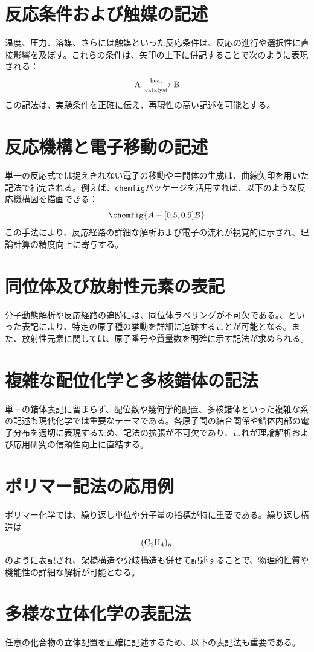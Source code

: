 \documentclass{ltjsarticle}
\begin{document}
\section{反応条件および触媒の記述}
温度、圧力、溶媒、さらには触媒といった反応条件は、反応の進行や選択性に直接影響を及ぼす。これらの条件は、矢印の上下に併記することで次のように表現される：
\[
\ce{A ->[heat][catalyst] B}
\]
この記法は、実験条件を正確に伝え、再現性の高い記述を可能とする。

\section{反応機構と電子移動の記述}
単一の反応式では捉えきれない電子の移動や中間体の生成は、曲線矢印を用いた記法で補完される。例えば、\texttt{chemfig}パッケージを活用すれば、以下のような反応機構図を描画できる：
\[
\chemfig{A -[0.5,0.5]B}
\]
この手法により、反応経路の詳細な解析および電子の流れが視覚的に示され、理論計算の精度向上に寄与する。

\section{同位体及び放射性元素の表記}
分子動態解析や反応経路の追跡には、同位体ラベリングが不可欠である。、といった表記により、特定の原子種の挙動を詳細に追跡することが可能となる。また、放射性元素に関しては、原子番号や質量数を明確に示す記法が求められる。

\section{複雑な配位化学と多核錯体の記法}
単一の錯体表記に留まらず、配位数や幾何学的配置、多核錯体といった複雑な系の記述も現代化学では重要なテーマである。各原子間の結合関係や錯体内部の電子分布を適切に表現するため、記法の拡張が不可欠であり、これが理論解析および応用研究の信頼性向上に直結する。

\section{ポリマー記法の応用例}
ポリマー化学では、繰り返し単位や分子量の指標が特に重要である。繰り返し構造は
\[
\ce{(C2H4)_n}
\]
のように表記され、架橋構造や分岐構造も併せて記述することで、物理的性質や機能性の詳細な解析が可能となる。

\section{多様な立体化学の表記法}
任意の化合物の立体配置を正確に記述するため、以下の表記法も重要である。
\end{document}
